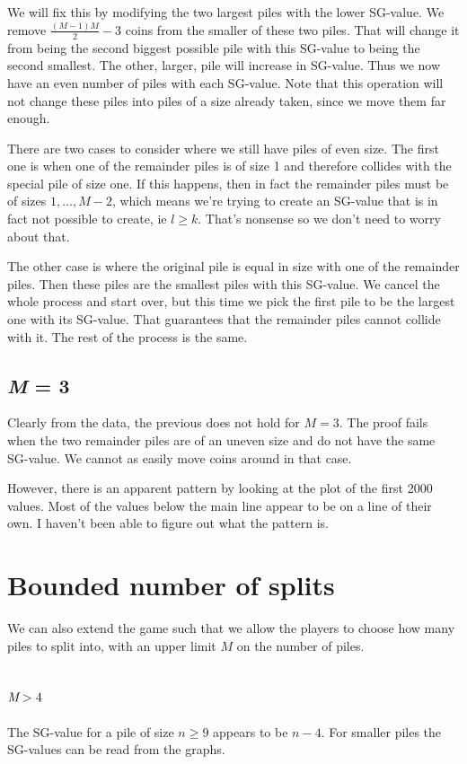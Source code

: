 \documentclass[english,a4paper,twoside]{amsart}
\theoremstyle{definition}
\begin{document}
We will fix this by modifying the two largest piles with the lower SG-value. We remove $\frac{(M-1)M}{2} - 3$
coins from the smaller of these two piles. That will change it from being the second biggest possible
pile with this SG-value to being the second smallest. The other, larger, pile will increase in SG-value.
Thus we now have an even number of piles with each SG-value. Note that this operation will not
change these piles into piles of a size already taken, since we move them far enough.

There are two cases to consider where we still have piles of even size. The first one is when one of the
remainder piles is of size 1 and therefore collides with the special pile of size one. If this happens,
then in fact the remainder piles must be of sizes $1, ..., M-2$, which means we're trying to create
an SG-value that is in fact not possible to create, ie $l \geq k$. That's nonsense so we don't need
to worry about that.

The other case is where the original pile is equal in size with one of the remainder piles. Then these
piles are the smallest piles with this SG-value. We cancel the whole process and start over, but this
time we pick the first pile to be the largest one with its SG-value. That guarantees that the remainder
piles cannot collide with it. The rest of the process is the same.

\subsection{\emph{M} = 3}
Clearly from the data, the previous does not hold for $M=3$. The proof fails when the two remainder
piles are of an uneven size and do not have the same SG-value. We cannot as easily move coins around
in that case.

However, there is an apparent pattern by looking at the plot of the first
2000 values. Most of the values below the main line appear to be on a line of their own. I haven't
been able to figure out what the pattern is.

\section{Bounded number of splits}
We can also extend the game such that we allow the players to choose how many piles to split into,
with an upper limit $M$ on the number of piles.
\subsection{$\emph{M} > 4$}
The SG-value for a pile of size $n \geq 9$ appears to be $n-4$.
For smaller piles the SG-values can be read from the graphs.
\end{document}
